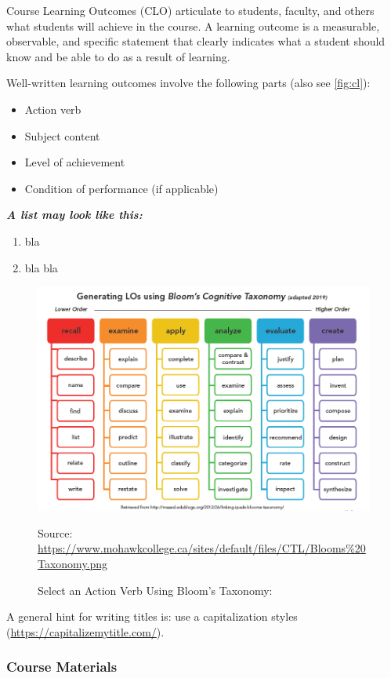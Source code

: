 \documentclass{article}
\begin{document}
Course Learning Outcomes (CLO) articulate to students, faculty, and others what students will achieve in the course.
A learning outcome  is a measurable, observable, and specific statement that clearly indicates what a student should know and be able to do as a result of learning.

Well-written learning outcomes involve the following parts (also see \autoref{fig:cl}):
\begin{itemize}
\item Action verb
\item Subject content 
\item Level of achievement 
\item Condition of performance (if applicable)
\end{itemize}

\noindent \textbf{\textit{A list may look like this:}}
\begin{enumerate}[CLO 1]
	\item bla 
	\item bla bla
\end{enumerate} 


\begin{figure}
	\centering
	\includegraphics[width=0.85\linewidth]{cl}
	\caption{Select an Action Verb Using Bloom’s Taxonomy:}\label{fig:cl}
	
\tiny	Source: \url{https://www.mohawkcollege.ca/sites/default/files/CTL/Blooms\%20Taxonomy.png}
\end{figure}

A general hint for writing titles is: use a capitalization styles (\url{https://capitalizemytitle.com/}).

\subsubsection*{Course Materials}
\end{document}
